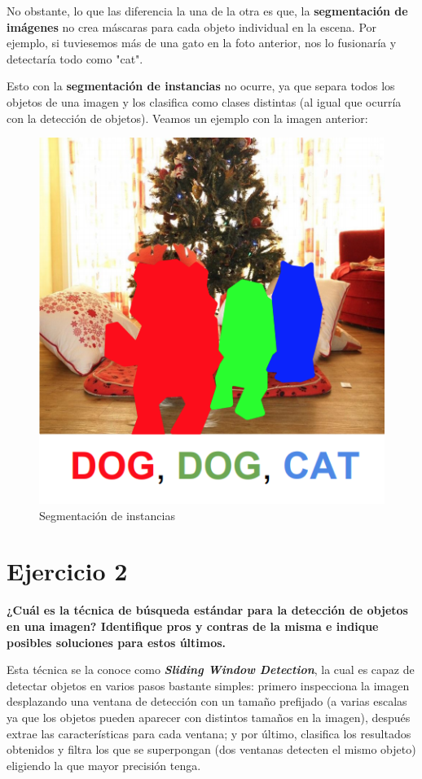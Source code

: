 \documentclass[11pt,a4paper]{article}
\begin{document}
No obstante, lo que las diferencia la una de la otra es que, la \textbf{segmentación de imágenes} no crea máscaras para cada objeto individual en la escena. Por
ejemplo, si tuviesemos más de una gato en la foto anterior, nos lo fusionaría y detectaría todo como "cat".

Esto con la \textbf{segmentación de instancias} no ocurre, ya que separa todos los objetos de una imagen y los clasifica como clases distintas (al igual que ocurría
con la detección de objetos). Veamos un ejemplo con la imagen anterior:
\begin{figure}[H]
\centering
\includegraphics[scale=0.5]{img/image_segmentation.png}
\caption{Segmentación de instancias}
\end{figure}


\section*{Ejercicio 2}

\textbf{¿Cuál es la técnica de búsqueda estándar para la detección de objetos en una imagen? Identifique pros y contras de la misma e indique
posibles soluciones para estos últimos.}

Esta técnica se la conoce como \textbf{\textit{Sliding Window Detection}}, la cual es capaz de detectar objetos en varios pasos bastante simples: primero
inspecciona la imagen desplazando una ventana de detección con un tamaño prefijado (a varias escalas ya que los objetos pueden aparecer con distintos
tamaños en la imagen), después extrae las características para cada ventana; y por último, clasifica los resultados obtenidos y filtra los que se superpongan
(dos ventanas detecten el mismo objeto) eligiendo la que mayor precisión tenga.
\end{document}
